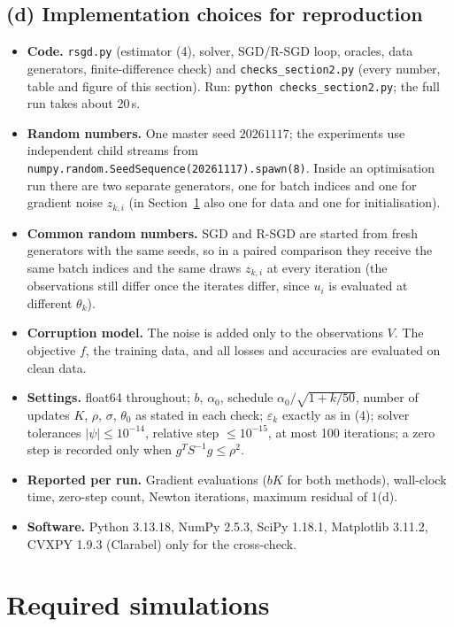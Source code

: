 \documentclass[11pt,a4paper]{article}
\begin{document}
\subsection{(d) Implementation choices for reproduction}\label{sec:repro2}

\begin{itemize}
\item \textbf{Code.} \texttt{rsgd.py} (estimator (4), solver, SGD/R-SGD loop, oracles,
data generators, finite-difference check) and \texttt{checks\_section2.py} (every
number, table and figure of this section). Run: \texttt{python checks\_section2.py};
the full run takes about 20\,s.
\item \textbf{Random numbers.} One master seed $20261117$; the experiments use
independent child streams from \texttt{numpy.random.SeedSequence(20261117).spawn(8)}.
Inside an optimisation run there are two separate generators, one for batch indices
and one for gradient noise $z_{k,i}$ (in Section~\ref{sec:sims} also one for data and one for
initialisation).
\item \textbf{Common random numbers.} SGD and R-SGD are started from fresh generators
with the same seeds, so in a paired comparison they receive the same batch indices and
the same draws $z_{k,i}$ at every iteration (the observations still differ once the
iterates differ, since $u_i$ is evaluated at different $\theta_k$).
\item \textbf{Corruption model.} The noise is added only to the observations $V$.
The objective $f$, the training data, and all losses and accuracies are evaluated on
clean data.
\item \textbf{Settings.} float64 throughout; $b$, $\alpha_0$, schedule
$\alpha_0/\sqrt{1+k/50}$, number of updates $K$, $\rho$, $\sigma$, $\theta_0$ as stated in
each check; $\varepsilon_k$ exactly as in (4); solver tolerances
$|\psi|\le10^{-14}$, relative step $\le10^{-15}$, at most 100 iterations; a zero step is
recorded only when $g^TS^{-1}g\le\rho^2$.
\item \textbf{Reported per run.} Gradient evaluations ($bK$ for both methods),
wall-clock time, zero-step count, Newton iterations, maximum residual of 1(d).
\item \textbf{Software.} Python 3.13.18, NumPy 2.5.3, SciPy 1.18.1, Matplotlib 3.11.2,
CVXPY 1.9.3 (Clarabel) only for the cross-check.
\end{itemize}

\section{Required simulations}\label{sec:sims}
\end{document}
